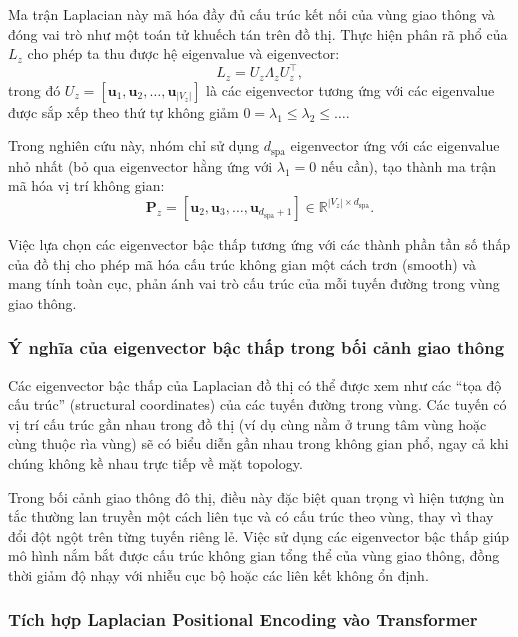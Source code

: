 Ma trận Laplacian này mã hóa đầy đủ cấu trúc kết nối của vùng giao thông và đóng vai trò
như một toán tử khuếch tán trên đồ thị. Thực hiện phân rã phổ của $L_z$ cho phép ta thu
được hệ eigenvalue và eigenvector:
\begin{equation}
L_z = U_z \Lambda_z U_z^\top,
\end{equation}
trong đó $U_z = [\mathbf{u}_1, \mathbf{u}_2, \dots, \mathbf{u}_{|V_z|}]$ là các eigenvector
tương ứng với các eigenvalue được sắp xếp theo thứ tự không giảm
$0 = \lambda_1 \le \lambda_2 \le \dots$.

Trong nghiên cứu này, nhóm chỉ sử dụng $d_{\text{spa}}$ eigenvector ứng với các
eigenvalue nhỏ nhất (bỏ qua eigenvector hằng ứng với $\lambda_1 = 0$ nếu cần), tạo thành
ma trận mã hóa vị trí không gian:
\begin{equation}
\mathbf{P}_z = [\mathbf{u}_2, \mathbf{u}_3, \dots, \mathbf{u}_{d_{\text{spa}}+1}]
\in \mathbb{R}^{|V_z| \times d_{\text{spa}}}.
\end{equation}

Việc lựa chọn các eigenvector bậc thấp tương ứng với các thành phần tần số thấp của đồ
thị cho phép mã hóa cấu trúc không gian một cách trơn (smooth) và mang tính toàn cục,
phản ánh vai trò cấu trúc của mỗi tuyến đường trong vùng giao thông.

\subsubsection{Ý nghĩa của eigenvector bậc thấp trong bối cảnh giao thông}
\label{subsubsec:low_freq_interpretation}

Các eigenvector bậc thấp của Laplacian đồ thị có thể được xem như các ``tọa độ cấu trúc''
(structural coordinates) của các tuyến đường trong vùng. Các tuyến có vị trí cấu trúc
gần nhau trong đồ thị (ví dụ cùng nằm ở trung tâm vùng hoặc cùng thuộc rìa vùng) sẽ có
biểu diễn gần nhau trong không gian phổ, ngay cả khi chúng không kề nhau trực tiếp về
mặt topology.

Trong bối cảnh giao thông đô thị, điều này đặc biệt quan trọng vì hiện tượng ùn tắc thường
lan truyền một cách liên tục và có cấu trúc theo vùng, thay vì thay đổi đột ngột trên từng
tuyến riêng lẻ. Việc sử dụng các eigenvector bậc thấp giúp mô hình nắm bắt được cấu trúc
không gian tổng thể của vùng giao thông, đồng thời giảm độ nhạy với nhiễu cục bộ hoặc các
liên kết không ổn định.

\subsubsection{Tích hợp Laplacian Positional Encoding vào Transformer}
\label{subsubsec:pe_integration}

